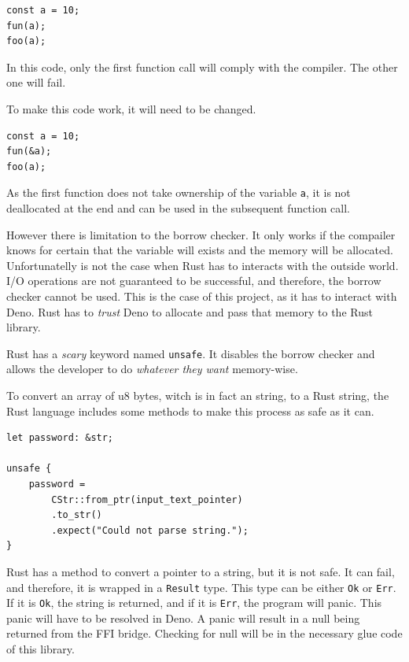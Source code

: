 \documentclass[10pt,journal,compsoc]{IEEEtran}
\begin{document}
\begin{lstlisting}
const a = 10;
fun(a);
foo(a);
    \end{lstlisting}

In this code, only the first function call will comply with the compiler. The other one will fail.

To make this code work, it will need to be changed.

\begin{lstlisting}
const a = 10;
fun(&a);
foo(a);
\end{lstlisting}

As the first function does not take ownership of the variable \verb|a|, it is not deallocated at the end and can be used in the subsequent function call.

However there is limitation to the borrow checker. It only works if the compailer knows for certain that the variable will exists and the memory will be allocated. Unfortunatelly is not the case when Rust has to interacts with the outside world. I/O operations are not guaranteed to be successful, and therefore, the borrow checker cannot be used. This is the case of this project, as it has to interact with Deno. Rust has to \textit{trust} Deno to allocate and pass that memory to the Rust library.

Rust has a \textit{scary} keyword named \verb|unsafe|. It disables the borrow checker and allows the developer to do \textit{whatever they want} memory-wise.

To convert an array of u8 bytes, witch is in fact an string, to a Rust string, the Rust language includes some methods to make this process as safe as it can.

\begin{lstlisting}
let password: &str;

unsafe {
    password = 
        CStr::from_ptr(input_text_pointer)
        .to_str()
        .expect("Could not parse string.");
}
\end{lstlisting}

Rust has a method to convert a pointer to a string, but it is not safe. It can fail, and therefore, it is wrapped in a \verb|Result| type. This type can be either \verb|Ok| or \verb|Err|. If it is \verb|Ok|, the string is returned, and if it is \verb|Err|, the program will panic. This panic will have to be resolved in Deno. A panic will result in a null being returned from the FFI bridge. Checking for null will be in the necessary glue code of this library.
\end{document}
